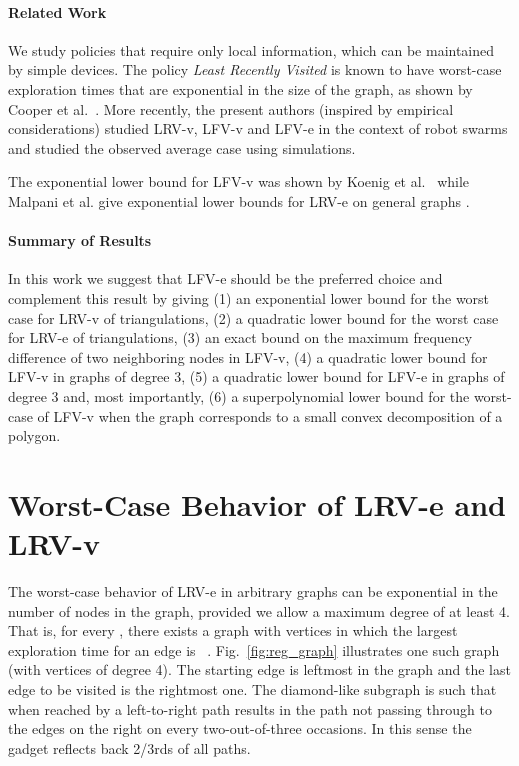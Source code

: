 \paragraph{Related Work}
\label{sec:RelatedWork} We study policies that require only local information, which can be
maintained by simple devices.  The policy {\em Least Recently Visited}
is known to have worst-case exploration times that are exponential
in the size of the graph, as shown by Cooper et al.~\cite{cik+-drwug-11}.
More recently, the present authors (inspired by empirical considerations) studied LRV-v, LFV-v
and LFV-e in the context of robot swarms and studied the observed average case
using simulations.

The exponential lower bound for LFV-v was shown by Koenig et al.~\cite{ksl+-ants-01}
while Malpani et al. give exponential lower bounds for LRV-e on general graphs \cite{mcvw+-distr-05}.

\paragraph{Summary of Results} In this work we suggest that LFV-e should be the preferred
choice and complement this result by giving (1) an exponential lower bound for the
worst case for LRV-v of triangulations, (2) a quadratic lower bound for
the worst case for LRV-e of triangulations, (3) an exact bound on the maximum frequency
difference of two neighboring nodes in LFV-v, (4) a quadratic lower bound for LFV-v
in graphs of degree 3, (5) a quadratic lower bound for LFV-e
in graphs of degree 3 and, most importantly, (6) a superpolynomial lower bound for the
worst-case of LFV-v when the graph corresponds to a small convex decomposition of a polygon.


\section{Worst-Case Behavior of LRV-e and LRV-v}
\label{sec:LRV}
The worst-case behavior of LRV-e in arbitrary graphs can be
exponential in the number of nodes in the graph, provided we allow a maximum
degree of at least 4. That is, for every , there exists a graph with 
vertices in which the largest exploration time for an edge is
~\cite{cik+-drwug-11}.  Fig.~\ref{fig:reg_graph} illustrates one
such graph (with vertices of degree 4). The starting edge is leftmost in the graph
and the last edge to be visited is the rightmost one. The diamond-like subgraph is
such that when reached by a left-to-right path results in the path
not passing through to the edges on the right on every two-out-of-three
occasions. In this sense the gadget reflects back 2/3rds of all paths.

